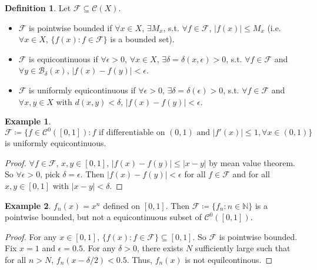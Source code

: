 \documentclass[12pt]{article}
\theoremstyle{plain}
\theoremstyle{definition}
\newtheorem*{defn}{Definition}
\newtheorem*{eg}{Example}
\begin{document}
\begin{defn}
    Let $\mathcal{F}\subseteq \mathcal{C}(X)$.
    \begin{itemize}
        \item $\mathcal{F}$ is pointwise bounded if $\forall x\in X$, $\exists
            M_x$, s.t. $\forall f\in\mathcal{F}$, $|f(x)|\leq M_x$ (i.e. $\forall
            x\in X$, $\{f(x): f\in\mathcal{F}\}$ is a bounded set).
        \item $\mathcal{F}$ is equicontinuous if $\forall \epsilon>0$, $\forall
        x\in X$, $\exists \delta=\delta(x,\epsilon)>0$, s.t.  $\forall
        f\in\mathcal{F}$ and $\forall y\in\mathcal{B}_\delta(x)$,
        $|f(x)-f(y)|<\epsilon$.
        \item $\mathcal{F}$ is uniformly equicontinuous if $\forall
            \epsilon>0$, $\exists \delta=\delta(\epsilon)>0$, s.t. $\forall
            f\in\mathcal{F}$ and $\forall x,y\in X$ with $d(x,y)<\delta$,
            $|f(x)-f(y)|<\epsilon$.
    \end{itemize}
\end{defn}
\begin{eg}
    $\mathcal{F}\coloneqq\{f\in\mathcal{C}^0([0,1]):f\text{ if differentiable
    on }(0,1)\text{ and }|f'(x)|\leq 1, \forall x\in(0,1)\}$ is uniformly
    equicontinuous.
\end{eg}
\begin{proof}
    $\forall f\in\mathcal{F}$, $x,y\in[0,1]$, $|f(x)-f(y)|\leq |x-y|$ by mean
    value theorem.
    So $\forall \epsilon>0$, pick $\delta=\epsilon$.
    Then $|f(x)-f(y)|<\epsilon$ for all $f\in\mathcal{F}$ and for all $x,y\in[0,1]$ with $|x-y|<\delta$.
\end{proof}

\begin{eg}
    $f_n(x)=x^n$ defined on $[0,1]$.
    Then $\mathcal{F}\coloneqq\{f_n:n\in\mathbb{N}\}$ is a pointwise
    bounded, but not a equicontinuous subset of $\mathcal{C}^0([0,1])$.
\end{eg}
\begin{proof}
    For any $x\in [0,1]$, $\{f(x):f\in\mathcal{F}\}\subseteq[0,1]$.
    So $\mathcal{F}$ is pointwise bounded.
    Fix $x=1$ and $\epsilon=0.5$.
    For any $\delta>0$, there exists $N$ sufficiently large such that for all
    $n>N$, $f_n(x-\delta/2)<0.5$.
    Thus, $f_n(x)$ is not equilcontinous.
\end{proof}
\end{document}
